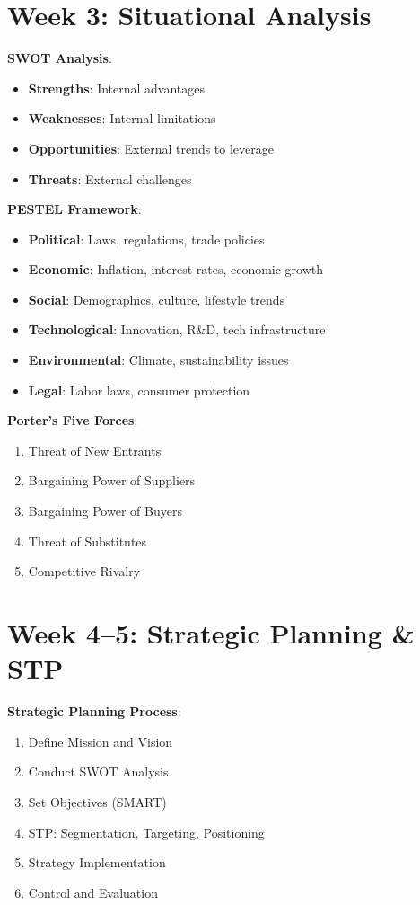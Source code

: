 \documentclass[12pt]{article}
\begin{document}
\section*{\faSearch\hspace{0.5em} Week 3: Situational Analysis}

\textbf{SWOT Analysis}:
\begin{itemize}[leftmargin=*]
    \item \textbf{Strengths}: Internal advantages
    \item \textbf{Weaknesses}: Internal limitations
    \item \textbf{Opportunities}: External trends to leverage
    \item \textbf{Threats}: External challenges
\end{itemize}

\textbf{PESTEL Framework}:
\begin{itemize}[leftmargin=*]
    \item \textbf{Political}: Laws, regulations, trade policies
    \item \textbf{Economic}: Inflation, interest rates, economic growth
    \item \textbf{Social}: Demographics, culture, lifestyle trends
    \item \textbf{Technological}: Innovation, R\&D, tech infrastructure
    \item \textbf{Environmental}: Climate, sustainability issues
    \item \textbf{Legal}: Labor laws, consumer protection
\end{itemize}

\textbf{Porter’s Five Forces}:
\begin{enumerate}[leftmargin=*]
    \item Threat of New Entrants
    \item Bargaining Power of Suppliers
    \item Bargaining Power of Buyers
    \item Threat of Substitutes
    \item Competitive Rivalry
\end{enumerate}

\section*{Week 4–5: Strategic Planning \& STP}

\textbf{Strategic Planning Process}:
\begin{enumerate}[leftmargin=*]
    \item Define Mission and Vision
    \item Conduct SWOT Analysis
    \item Set Objectives (SMART)
    \item STP: Segmentation, Targeting, Positioning
    \item Strategy Implementation
    \item Control and Evaluation
\end{enumerate}
\end{document}
